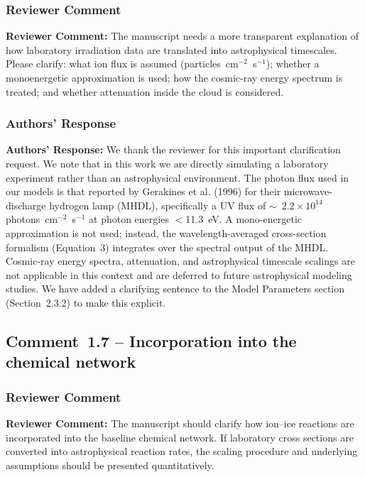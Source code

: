 \documentclass[12pt]{article}
\newcommand{\reviewlabel}{\textbf{\textcolor{commentframe}{Reviewer Comment:}}}
\newcommand{\responselabel}{\textbf{\textcolor{responseframe}{Authors' Response:}}}
\begin{document}
\subsubsection{Reviewer Comment}
\begin{reviewerbox}
\reviewlabel{} The manuscript needs a more transparent explanation of how
laboratory irradiation data are translated into astrophysical timescales.
Please clarify: what ion flux is assumed (particles~cm$^{-2}$~s$^{-1}$);
whether a monoenergetic approximation is used; how the cosmic-ray energy
spectrum is treated; and whether attenuation inside the cloud is considered.
\end{reviewerbox}

\subsubsection{Authors' Response}
\begin{responsebox}
\responselabel{} We thank the reviewer for this important clarification
request. We note that in this work we are directly simulating a
laboratory experiment rather than an astrophysical environment. The
photon flux used in our models is that reported by
Gerakines et al. (1996) for their microwave-discharge hydrogen lamp
(MHDL), specifically a UV flux of $\sim$\, $2.2\times10^{14}$ photons~cm$^{-2}$~s$^{-1}$ at photon energies
$<$11.3~eV. A mono-energetic approximation is not used; instead, the
wavelength-averaged cross-section formalism (Equation~3) integrates over the
spectral output of the MHDL. Cosmic-ray energy spectra, attenuation, and
astrophysical timescale scalings are not applicable in this context and are
deferred to future astrophysical modeling studies. We have added a clarifying
sentence to the Model Parameters section (Section~2.3.2) to make this explicit.
\end{responsebox}

\subsection{Comment~1.7 -- Incorporation into the chemical network}

\subsubsection{Reviewer Comment}
\begin{reviewerbox}
\reviewlabel{} The manuscript should clarify how ion--ice reactions are
incorporated into the baseline chemical network. If laboratory cross sections
are converted into astrophysical reaction rates, the scaling procedure and
underlying assumptions should be presented quantitatively.
\end{reviewerbox}
\end{document}
